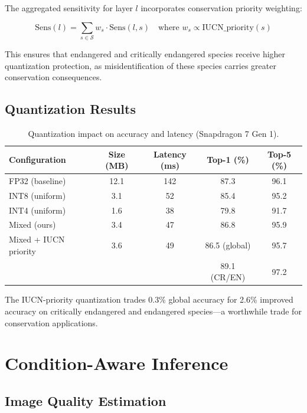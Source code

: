 \documentclass[11pt,a4paper]{article}
\begin{document}
The aggregated sensitivity for layer $l$ incorporates conservation priority weighting:

\begin{equation}
    \text{Sens}(l) = \sum_{s \in \mathcal{S}} w_s \cdot \text{Sens}(l, s) \quad \text{where } w_s \propto \text{IUCN\_priority}(s)
\end{equation}

This ensures that endangered and critically endangered species receive higher quantization protection, as misidentification of these species carries greater conservation consequences.

\subsection{Quantization Results}

\begin{table}[H]
\centering
\caption{Quantization impact on accuracy and latency (Snapdragon 7 Gen 1).}
\label{tab:quantization}
\begin{tabular}{@{}lcccc@{}}
\toprule
\textbf{Configuration} & \textbf{Size (MB)} & \textbf{Latency (ms)} & \textbf{Top-1 (\%)} & \textbf{Top-5 (\%)} \\
\midrule
FP32 (baseline) & 12.1 & 142 & 87.3 & 96.1 \\
INT8 (uniform) & 3.1 & 52 & 85.4 & 95.2 \\
INT4 (uniform) & 1.6 & 38 & 79.8 & 91.7 \\
Mixed (ours) & 3.4 & 47 & 86.8 & 95.9 \\
Mixed + IUCN priority & 3.6 & 49 & 86.5 (global) & 95.7 \\
 & & & 89.1 (CR/EN) & 97.2 \\
\bottomrule
\end{tabular}
\end{table}

The IUCN-priority quantization trades 0.3\% global accuracy for 2.6\% improved accuracy on critically endangered and endangered species---a worthwhile trade for conservation applications.

\section{Condition-Aware Inference}
\label{sec:condition}

\subsection{Image Quality Estimation}
\end{document}
